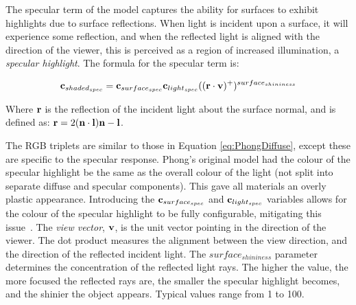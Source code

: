 The specular term of the model captures the ability for surfaces to exhibit highlights due to surface reflections. When light is incident upon a surface, it will experience some reflection, and when the reflected light is aligned with the direction of the viewer, this is perceived as a region of increased illumination, a \textit{specular highlight}. The formula for the specular term is:

\vspace{-0.3cm}

\begin{equation}
	\mathbf{c}_{shaded_{spec}} = \mathbf{c}_{surface_{spec}}\mathbf{c}_{light_{spec}}((\mathbf{r}\cdot\mathbf{v})^+)^{surface_{shininess}}
\end{equation}

Where \begin{math}\mathbf{r}\end{math} is the reflection of the incident light about the surface normal, and is defined as: \begin{math}\mathbf{r} = 2(\mathbf{n}\cdot\mathbf{l})\mathbf{n} - \mathbf{l}\end{math}.

The RGB triplets are similar to those in Equation \ref{eq:PhongDiffuse}, except these are specific to the specular response. Phong's original model had the colour of the specular highlight be the same as the overall colour of the light (not split into separate diffuse and specular components). This gave all materials an overly plastic appearance. Introducing the \begin{math}\mathbf{c}_{surface_{spec}}\end{math} and \begin{math}\mathbf{c}_{light_{spec}}\end{math} variables allows for the colour of the specular highlight to be fully configurable, mitigating this issue~\cite{LightingModelForComputerAnimators}. The \textit{view vector}, \begin{math}\mathbf{v}\end{math}, is the unit vector pointing in the direction of the viewer. The dot product measures the alignment between the view direction, and the direction of the reflected incident light. The \begin{math}surface_{shininess}\end{math} parameter determines the concentration of the reflected light rays. The higher the value, the more focused the reflected rays are, the smaller the specular highlight becomes, and the shinier the object appears. Typical values range from 1 to 100.

